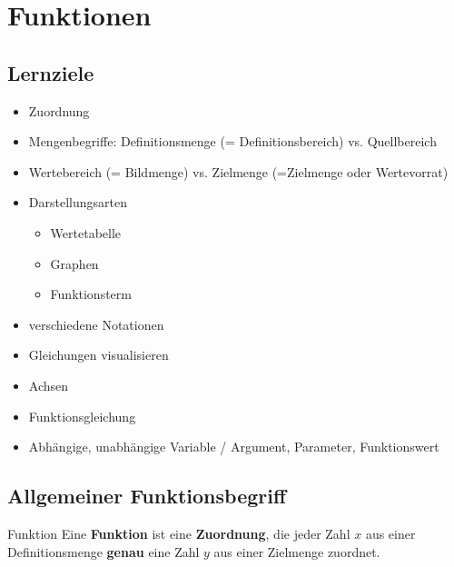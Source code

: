 
\section{Funktionen}
\subsection*{Lernziele}

\begin{itemize}
 \item Zuordnung
 \item Mengenbegriffe: Definitionsmenge (= Definitionsbereich) vs. Quellbereich
 \item Wertebereich (= Bildmenge) vs. Zielmenge
   (=Zielmenge oder Wertevorrat)
 \item Darstellungsarten
   \begin{itemize}
      \item Wertetabelle
      \item Graphen
      \item Funktionsterm
   \end{itemize}
 \item verschiedene Notationen
 \item Gleichungen visualisieren
 \item Achsen
 \item Funktionsgleichung
 \item Abhängige, unabhängige Variable / Argument, Parameter, Funktionswert
\end{itemize}


\newpage
\subsection{Allgemeiner Funktionsbegriff}

\begin{definition}{Funktion}{}
    Eine \textbf{Funktion} ist eine \textbf{Zuordnung}, die jeder Zahl
    $x$ aus einer Definitionsmenge \textbf{genau} eine Zahl $y$ aus
    einer Zielmenge zuordnet.\\
\end{definition}
    

